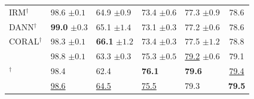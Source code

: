 \begin{table}[htbp]
\begin{tabular}{lllll|c}
IRM$^\dagger$ & 98.6 \scriptsize$\pm0.1$ & 64.9 \scriptsize$\pm0.9$ & 73.4 \scriptsize$\pm0.6$ & 77.3 \scriptsize$\pm0.9$ & 78.6 \\
DANN$^\dagger$ & \textbf{99.0} \scriptsize$\pm0.3$ & 65.1 \scriptsize$\pm1.4$ & 73.1 \scriptsize$\pm0.3$ & 77.2 \scriptsize$\pm0.6$ & 78.6 \\
CORAL$^\dagger$ & 98.3 \scriptsize$\pm0.1$ & \textbf{66.1} \scriptsize$\pm1.2$ & 73.4 \scriptsize$\pm0.3$ & 77.5 \scriptsize$\pm1.2$ & 78.8 \\
\swad{} & 98.8 \scriptsize$\pm0.1$ & 63.3 \scriptsize$\pm0.3$ & 75.3 \scriptsize$\pm0.5$ & \underline{79.2} \scriptsize$\pm0.6$ & 79.1 \\
\diwa{}$^\dagger$ & 98.4 & 62.4 & \textbf{76.1} & \textbf{79.6} & \underline{79.4} \\
\midrule
\cda{} & \underline{98.6} & \underline{64.5} & \underline{75.5} & 79.3 & \textbf{79.5} \\
\bottomrule
\end{tabular}
\end{table}

